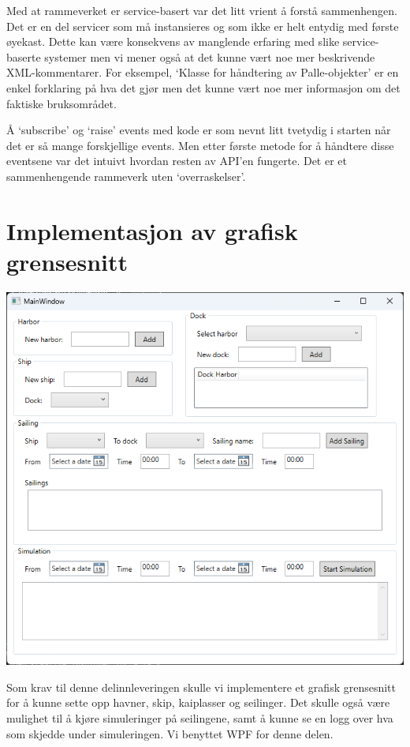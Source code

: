 \documentclass[12pt]{article}
\begin{document}
Med at rammeverket er service-basert var det litt vrient å forstå sammenhengen. Det er en del servicer som må
instansieres og som ikke er helt entydig med første øyekast. Dette kan være konsekvens av manglende erfaring med slike service-baserte 
systemer men vi mener også at det kunne vært noe mer beskrivende XML-kommentarer. For eksempel, `Klasse for håndtering av Palle-objekter'
er en enkel forklaring på hva det gjør men det kunne vært noe mer informasjon om det faktiske bruksområdet. 

Å `subscribe' og `raise' events med kode er som nevnt litt tvetydig i starten når det er så mange forskjellige events.
Men etter første metode for å håndtere disse eventsene var det intuivt hvordan resten av API'en fungerte. Det er et sammenhengende
rammeverk uten `overraskelser'.

\section{Implementasjon av grafisk grensesnitt}
\includegraphics*[scale=0.6]{gui.png}

Som krav til denne delinnleveringen skulle vi implementere et grafisk grensesnitt for 
å kunne sette opp havner, skip, kaiplasser og seilinger. Det skulle også være mulighet til
å kjøre simuleringer på seilingene, samt å kunne se en logg over hva som skjedde under simuleringen.
Vi benyttet WPF for denne delen.
\end{document}
